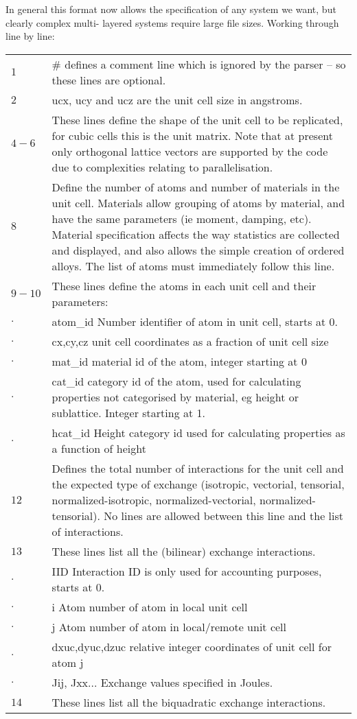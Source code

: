 In general this format now allows the specification of any system we want, but
clearly complex multi- layered systems require large file sizes. Working through
line by line:

\noindent
\begin{longtable}{ l p{8cm} }
$1$    & \# defines a comment line which is ignored by the parser – so these lines are optional.\\
$2$    & ucx, ucy and ucz are the unit cell size in angstroms.\\
$4-6$  & These lines define the shape of the unit cell to be replicated, for cubic cells this is the unit matrix. Note that at present only orthogonal lattice vectors are supported by the code due to complexities relating to parallelisation.\\
$8$    & Define the number of atoms and number of materials in the unit cell. Materials allow grouping of atoms by material, and have the same parameters (ie moment, damping, etc). Material specification affects the way statistics are collected and displayed, and also allows the simple creation of ordered alloys. The list of atoms must immediately follow this line.\\
$9-10$ & These lines define the atoms in each unit cell and their parameters:\\
$.$	 & atom\_id    Number identifier of atom in unit cell, starts at 0.\\
$.$	 & cx,cy,cz   unit cell coordinates as a fraction of unit cell size\\
$.$	 & mat\_id  material id of the atom, integer starting at 0\\
$.$	 & cat\_id  category id of the atom, used for calculating properties not categorised by material, eg height or sublattice. Integer starting at 1.\\
$.$	 & hcat\_id Height category id used for calculating properties as a function of height\\
$12$   & Defines the total number of interactions for the unit cell and the expected type of exchange
(isotropic, vectorial, tensorial, normalized-isotropic, normalized-vectorial, normalized-tensorial). No lines are allowed between this line and the list of interactions.\\
$13$   & These lines list all the (bilinear) exchange interactions.\\
$.$	   & IID Interaction ID is only used for accounting purposes, starts at 0.\\
$.$	   & i Atom number of atom in local unit cell\\
$.$    & j Atom number of atom in local/remote unit cell\\
$.$    & dxuc,dyuc,dzuc relative integer coordinates of unit cell for atom j\\
$.$    & Jij, Jxx... Exchange values specified in Joules. \\
$14$   & These lines list all the biquadratic exchange interactions.\\
\end{longtable}

